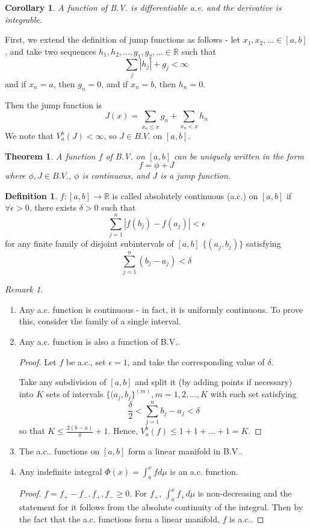\documentclass[11pt,a4paper]{report}
\newtheorem{corollary}[theorem]{Corollary}
\theoremstyle{plain}
\newtheorem{thm}{Theorem}[section]
\theoremstyle{definition}
\newtheorem*{defn}{Definition}
\theoremstyle{remark}
\newtheorem*{rem}{Remark}
\newcommand{\R}{\mathbb{R}}
\newcommand{\abs}[1]{\left| #1 \right|}
\begin{document}
\begin{corollary}
  A function of B.V. is differentiable a.e. and the derivative is integrable.
\end{corollary}

First, we extend the definition of jump functions as follows - let $x_1, x_2, \dots \in [a, b]$, and take two sequences $h_1, h_2, \dots, g_1, g_2, \dots \in \R$ such that
$$ \sum_j \abs{h_j} + {g_j} < \infty $$
and if $x_n = a$, then $g_n = 0$, and if $x_n = b$, then $h_n = 0$.

Then the jump function is
$$ J(x) = \sum_{x_n \le x} g_n + \sum_{x_n < x} h_n $$
We note that $V_a^b(J) < \infty$, so $J \in B.V.$ on $[a, b]$.

\begin{thm}
  A function $f$ of B.V. on $[a, b]$ can be uniquely written in the form
  $$ f = \phi + J $$
  where $\phi, J \in B.V.$, $\phi$ is continuous, and $J$ is a jump function.
\end{thm}

\begin{defn}
  $f: [a, b] \to \R$ is called absolutely continuous (a.c.) on $[a, b]$ if $\forall \epsilon > 0$, there exists $\delta > 0$ such that
  $$ \sum_{j=1}^n \abs{f(b_j) - f(a_j)} < \epsilon $$
  for any finite family of disjoint subintervals of $[a, b]$ $\{ (a_j, b_j)\}$ satisfying
  $$ \sum_{j=1}^n (b_j - a_j) < \delta $$
\end{defn}

\begin{rem}
  \begin{enumerate}
    \item Any a.c. function is continuous - in fact, it is uniformly continuous. To prove this, consider the family of a single interval.
    \item Any a.c. function is also a function of B.V..
        \begin{proof}
          Let $f$ be a.c., set $\epsilon = 1$, and take the corresponding value of $\delta$.

          Take any subdivision of $[a, b]$ and split it (by adding points if necessary) into $K$ sets of intervals $\{ (a_j, b_j \}^{(m)}, m = 1, 2, \dots, K$ with each set satisfying 
          $$ \frac{\delta}{2} < \sum_{j=1}^n b_j - a_j < \delta $$
          so that $K \le \frac{2(b - a)}{\delta} + 1$. Hence, $V_a^b(f) \le 1 + 1 + \dots + 1 = K$.
        \end{proof}
    \item The a.c.. functions on $[a, b]$ form a linear manifold in B.V..
    \item Any indefinite integral $\Phi(x) = \int_a^x f d\mu$ is an a.c. function.
        \begin{proof}
          $f = f_{+} - f_{-}, f_{+}, f_{-} \ge 0$. For $f_{+}$, $\int_a^x f_{+} d\mu$ is non-decreasing and the statement for it follows from the absolute continuity of the integral. Then by the fact that the a.c. functions form a linear manifold, $f$ is a.c..
        \end{proof}
  \end{enumerate}
\end{rem}
\end{document}
